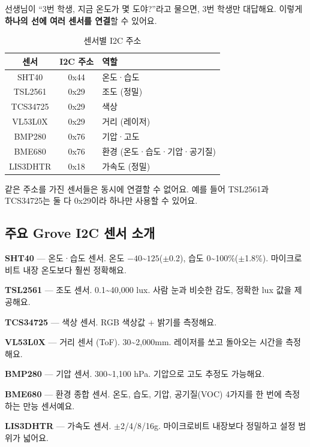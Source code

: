 \documentclass[11pt, a4paper]{article}
\begin{document}
선생님이 ``3번 학생, 지금 온도가 몇 도야?''라고 물으면, 3번 학생만 대답해요. 이렇게 \textbf{하나의 선에 여러 센서를 연결}할 수 있어요.

\begin{table}[H]\centering
\caption{센서별 I2C 주소}
\begin{tabular}{ccl}\toprule
\textbf{센서} & \textbf{I2C 주소} & \textbf{역할} \\\midrule
SHT40 & 0x44 & 온도·습도 \\
TSL2561 & 0x29 & 조도 (정밀) \\
TCS34725 & 0x29 & 색상 \\
VL53L0X & 0x29 & 거리 (레이저) \\
BMP280 & 0x76 & 기압·고도 \\
BME680 & 0x76 & 환경 (온도·습도·기압·공기질) \\
LIS3DHTR & 0x18 & 가속도 (정밀) \\
\bottomrule
\end{tabular}
\end{table}

\begin{warnbox}[주소 충돌 주의]
같은 주소를 가진 센서들은 동시에 연결할 수 없어요. 예를 들어 TSL2561과 TCS34725는 둘 다 0x29이라 하나만 사용할 수 있어요.
\end{warnbox}

\subsection{주요 Grove I2C 센서 소개}

\textbf{SHT40} — 온도·습도 센서. 온도 $-40$\textasciitilde$125$\textcelsius($\pm$0.2\textcelsius), 습도 0\textasciitilde100\%($\pm$1.8\%). 마이크로비트 내장 온도보다 훨씬 정확해요.

\textbf{TSL2561} — 조도 센서. 0.1\textasciitilde40,000 lux. 사람 눈과 비슷한 감도, 정확한 lux 값을 제공해요.

\textbf{TCS34725} — 색상 센서. RGB 색상값 + 밝기를 측정해요.

\textbf{VL53L0X} — 거리 센서 (ToF). 30\textasciitilde2,000mm. 레이저를 쏘고 돌아오는 시간을 측정해요.

\textbf{BMP280} — 기압 센서. 300\textasciitilde1,100 hPa. 기압으로 고도 추정도 가능해요.

\textbf{BME680} — 환경 종합 센서. 온도, 습도, 기압, 공기질(VOC) 4가지를 한 번에 측정하는 만능 센서예요.

\textbf{LIS3DHTR} — 가속도 센서. $\pm$2/4/8/16g. 마이크로비트 내장보다 정밀하고 설정 범위가 넓어요.
\end{document}
